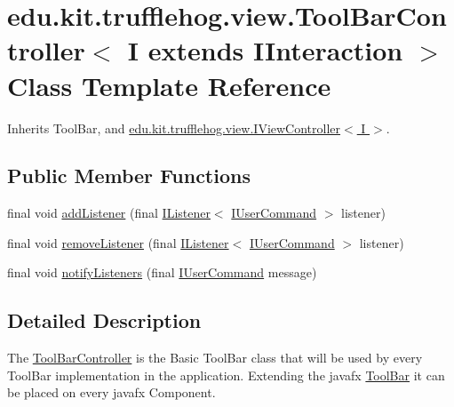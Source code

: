 \hypertarget{classedu_1_1kit_1_1trufflehog_1_1view_1_1_tool_bar_controller}{}\section{edu.\+kit.\+trufflehog.\+view.\+Tool\+Bar\+Controller$<$ I extends I\+Interaction $>$ Class Template Reference}
\label{classedu_1_1kit_1_1trufflehog_1_1view_1_1_tool_bar_controller}


Inherits Tool\+Bar, and \hyperlink{interfaceedu_1_1kit_1_1trufflehog_1_1view_1_1_i_view_controller}{edu.\+kit.\+trufflehog.\+view.\+I\+View\+Controller$<$ I $>$}.

\subsection*{Public Member Functions}
\begin{DoxyCompactItemize}
\item 
final void \hyperlink{classedu_1_1kit_1_1trufflehog_1_1view_1_1_tool_bar_controller_af04c371ef98223745b23a10775977e01}{add\+Listener} (final \hyperlink{interfaceedu_1_1kit_1_1trufflehog_1_1util_1_1_i_listener}{I\+Listener}$<$ \hyperlink{interfaceedu_1_1kit_1_1trufflehog_1_1command_1_1usercommand_1_1_i_user_command}{I\+User\+Command} $>$ listener)
\item 
final void \hyperlink{classedu_1_1kit_1_1trufflehog_1_1view_1_1_tool_bar_controller_a05d115f7bece98990c037806b8f8e54c}{remove\+Listener} (final \hyperlink{interfaceedu_1_1kit_1_1trufflehog_1_1util_1_1_i_listener}{I\+Listener}$<$ \hyperlink{interfaceedu_1_1kit_1_1trufflehog_1_1command_1_1usercommand_1_1_i_user_command}{I\+User\+Command} $>$ listener)
\item 
final void \hyperlink{classedu_1_1kit_1_1trufflehog_1_1view_1_1_tool_bar_controller_a6d73d191f2d52e81ce23e1698c988e80}{notify\+Listeners} (final \hyperlink{interfaceedu_1_1kit_1_1trufflehog_1_1command_1_1usercommand_1_1_i_user_command}{I\+User\+Command} message)
\end{DoxyCompactItemize}


\subsection{Detailed Description}
The \hyperlink{classedu_1_1kit_1_1trufflehog_1_1view_1_1_tool_bar_controller}{Tool\+Bar\+Controller} is the Basic Tool\+Bar class that will be used by every Tool\+Bar implementation in the application. Extending the javafx \hyperlink{}{Tool\+Bar} it can be placed on every javafx Component. 


